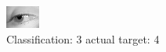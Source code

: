 \begin{figure}[h!]
\begin{center}
\includegraphics[width=0.60\columnwidth]{figures/ID2980_class_3_target_4.png}
\end{center}
\caption{ Classification: 3 actual target: 4}
\label{fig:ID2980_class_3_target_4}
\end{figure}

